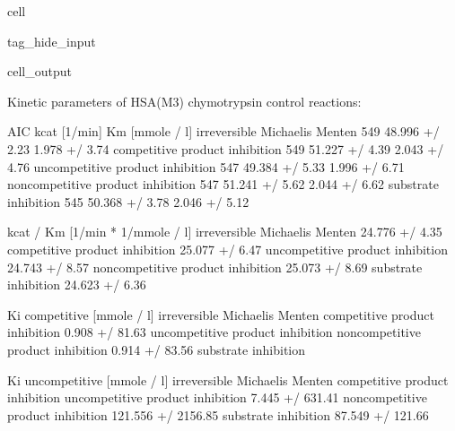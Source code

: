 \documentclass[letterpaper,10pt,english]{jupyterBook}
\begin{document}
\begin{sphinxuseclass}{cell}
\begin{sphinxuseclass}{tag_hide_input}
\begin{sphinxVerbatimOutput}
\begin{sphinxuseclass}{cell_output}
\begin{sphinxVerbatim}[commandchars=\\\{\}]
Kinetic parameters of HSA(M3) chymotrypsin control reactions:
\end{sphinxVerbatim}

\begin{sphinxVerbatim}[commandchars=\\\{\}]
                                    AIC      kcat [1/min]   Km [mmole / l]  \PYGZbs{}
irreversible Michaelis Menten      \PYGZhy{}549  48.996 +/\PYGZhy{} 2.23\PYGZpc{}  1.978 +/\PYGZhy{} 3.74\PYGZpc{}   
competitive product inhibition     \PYGZhy{}549  51.227 +/\PYGZhy{} 4.39\PYGZpc{}  2.043 +/\PYGZhy{} 4.76\PYGZpc{}   
uncompetitive product inhibition   \PYGZhy{}547  49.384 +/\PYGZhy{} 5.33\PYGZpc{}  1.996 +/\PYGZhy{} 6.71\PYGZpc{}   
non\PYGZhy{}competitive product inhibition \PYGZhy{}547  51.241 +/\PYGZhy{} 5.62\PYGZpc{}  2.044 +/\PYGZhy{} 6.62\PYGZpc{}   
substrate inhibition               \PYGZhy{}545  50.368 +/\PYGZhy{} 3.78\PYGZpc{}  2.046 +/\PYGZhy{} 5.12\PYGZpc{}   

                                   kcat / Km [1/min * 1/mmole / l]  \PYGZbs{}
irreversible Michaelis Menten                     24.776 +/\PYGZhy{} 4.35\PYGZpc{}   
competitive product inhibition                    25.077 +/\PYGZhy{} 6.47\PYGZpc{}   
uncompetitive product inhibition                  24.743 +/\PYGZhy{} 8.57\PYGZpc{}   
non\PYGZhy{}competitive product inhibition                25.073 +/\PYGZhy{} 8.69\PYGZpc{}   
substrate inhibition                              24.623 +/\PYGZhy{} 6.36\PYGZpc{}   

                                   Ki competitive [mmole / l]  \PYGZbs{}
irreversible Michaelis Menten                               \PYGZhy{}   
competitive product inhibition               0.908 +/\PYGZhy{} 81.63\PYGZpc{}   
uncompetitive product inhibition                            \PYGZhy{}   
non\PYGZhy{}competitive product inhibition           0.914 +/\PYGZhy{} 83.56\PYGZpc{}   
substrate inhibition                                        \PYGZhy{}   

                                   Ki uncompetitive [mmole / l]  
irreversible Michaelis Menten                                 \PYGZhy{}  
competitive product inhibition                                \PYGZhy{}  
uncompetitive product inhibition              7.445 +/\PYGZhy{} 631.41\PYGZpc{}  
non\PYGZhy{}competitive product inhibition         121.556 +/\PYGZhy{} 2156.85\PYGZpc{}  
substrate inhibition                         87.549 +/\PYGZhy{} 121.66\PYGZpc{}  
\end{sphinxVerbatim}

\noindent{}

\end{sphinxuseclass}\end{sphinxVerbatimOutput}

\end{sphinxuseclass}
\end{sphinxuseclass}
\end{document}
